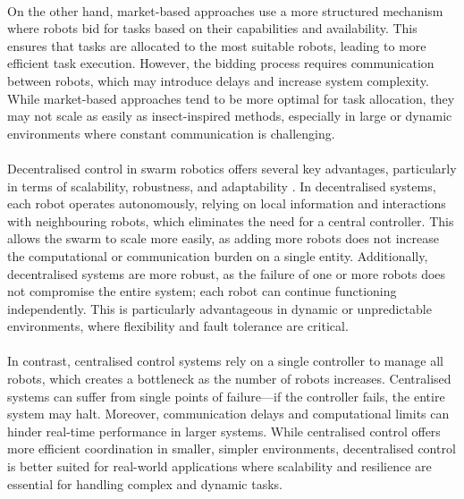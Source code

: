\paragraph*{}
On the other hand, market-based approaches \cite{brambilla2012property} use a more structured mechanism where robots bid for tasks based on their capabilities and availability. This ensures that tasks are allocated to the most suitable robots, leading to more efficient task execution. However, the bidding process requires communication between robots, which may introduce delays and increase system complexity. While market-based approaches tend to be more optimal for task allocation, they may not scale as easily as insect-inspired methods, especially in large or dynamic environments where constant communication is challenging.

\paragraph*{}
Decentralised control in swarm robotics offers several key advantages, particularly in terms of scalability, robustness, and adaptability \cite{st-onge2023swarm}. In decentralised systems, each robot operates autonomously, relying on local information and interactions with neighbouring robots, which eliminates the need for a central controller. This allows the swarm to scale more easily, as adding more robots does not increase the computational or communication burden on a single entity. Additionally, decentralised systems are more robust, as the failure of one or more robots does not compromise the entire system; each robot can continue functioning independently. This is particularly advantageous in dynamic or unpredictable environments, where flexibility and fault tolerance are critical.

\paragraph*{}
In contrast, centralised control systems rely on a single controller to manage all robots, which creates a bottleneck as the number of robots increases. Centralised systems can suffer from single points of failure—if the controller fails, the entire system may halt. Moreover, communication delays and computational limits can hinder real-time performance in larger systems. While centralised control offers more efficient coordination in smaller, simpler environments, decentralised control is better suited for real-world applications where scalability and resilience are essential for handling complex and dynamic tasks.

